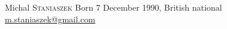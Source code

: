 \documentclass[a4paper,10pt]{article}
\begin{document}
\thispagestyle{empty}
\pagestyle{empty}
  {\Huge Michal \textsc{Staniaszek}} \hspace*{0.3cm} Born 7 December 1990, British national \hspace*{0.3cm} \href{mailto:contact@michalstaniaszek.com}{m.staniaszek@gmail.com}  


\vspace*{1pt}
\end{document}
